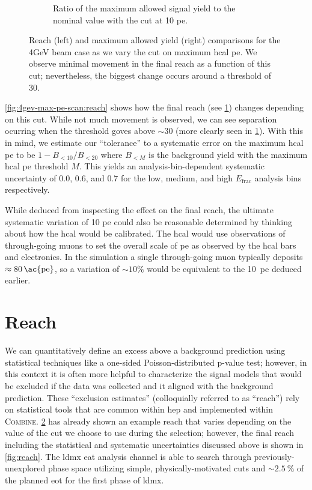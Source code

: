 \begin{figure}
\begin{subfigure}{0.48\textwidth}
    \caption{Ratio of the maximum allowed signal yield to the nominal value with the cut at 10 \ac{pe}.}
    \label{fig:4gev-max-pe-scan:ratio}
  \end{subfigure}
  \caption{Reach (left) and maximum allowed yield (right) comparisons for the 4GeV beam case
  as we vary the cut on maximum \ac{hcal} \ac{pe}.
  We observe minimal movement in the final reach as a function
  of this cut; nevertheless, the biggest change occurs around a threshold of 30.}
  \label{fig:4gev-max-pe-scan}
\end{figure}

\cref{fig:4gev-max-pe-scan:reach} shows how the final reach (see \cref{sec:ldmx:analysis:reach})
changes depending on this cut.
While not much movement is observed, we can see separation ocurring when the threshold
goves above $\sim 30$ (more clearly seen in \cref{fig:4gev-max-pe-scan:ratio}).
With this in mind, we estimate our ``tolerance'' to a systematic error on the maximum
\ac{hcal} \ac{pe} to be $1 - B_{< 10}/B_{< 20}$ where $B_{< M}$ is the background yield
with the maximum \ac{hcal} \ac{pe} threshold $M$.
This yields an analysis-bin-dependent systematic uncertainty of $0.0$, $0.6$, and $0.7$
for the low, medium, and high $E_\text{frac}$ analysis bins respectively.

While deduced from inspecting the effect on the final reach, the ultimate systematic
variation of 10 \ac{pe} could also be reasonable determined by thinking about how the \ac{hcal}
would be calibrated.
The \ac{hcal} would use observations of through-going muons to set the overall scale of \ac{pe}
as observed by the \ac{hcal} bars and electronics.
In the simulation a single through-going muon typically deposits $\approx\qty{80}{\ac{pe}}$,
so a variation of $\sim10\%$ would be equivalent to the \qty{10}{\ac{pe}} deduced earlier.

\section{Reach}
\label{sec:ldmx:analysis:reach}
We can quantitatively define an excess above a background prediction using statistical techniques
like a one-sided Poisson-distributed p-value test; however, in this context it is often more helpful
to characterize the signal models that would be excluded if the data was collected and it aligned
with the background prediction.
These ``exclusion estimates'' (colloquially referred to as ``reach'') rely on statistical tools
that are common within \ac{hep} and implemented within \textsc{Combine}\cite{cms-combine}.
\cref{fig:4gev-max-pe-scan} has already shown an example reach that varies depending on the value
of the cut we choose to use during the selection; however, the final reach including the statistical
and systematic uncertainties discussed above is shown in \cref{fig:reach}.
The \ac{ldmx} \ac{eat} analysis channel is able to search through previously-unexplored phase space
utilizing simple, physically-motivated cuts and $\sim \qty{2.5}{\percent}$ of the planned \ac{eot}
for the first phase of \ac{ldmx}.

